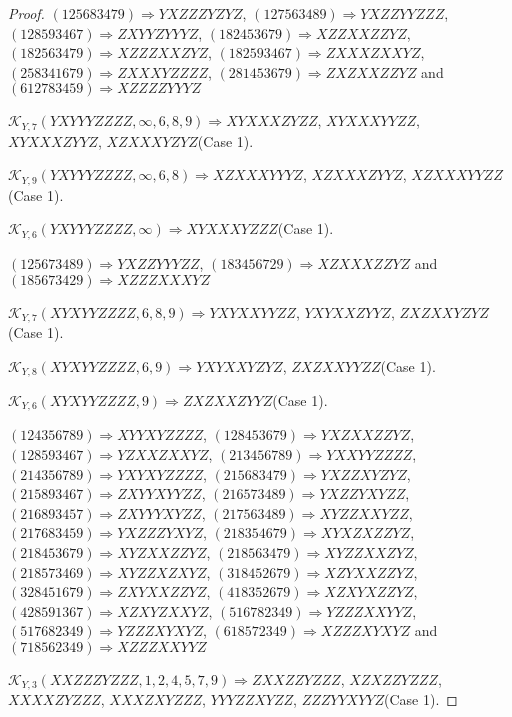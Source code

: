 \documentclass[12pt]{article}
\theoremstyle{plain}
\theoremstyle{definition}
\theoremstyle{remark}
\newcommand{\fancy}[1]{\mathcal{#1}}
\def\K{\fancy{K}}
\begin{document}
\begin{proof}
	$(1 2 5 6 8 3 4 7 9)\Rightarrow YXZZZYZYZ$, $(1 2 7 5 6 3 4 8 9)\Rightarrow YXZZYYZZZ$, $(1 2 8 5 9 3 4 6 7)\Rightarrow ZXYYZYYYZ$, $(1 8 2 4 5 3 6 7 9)\Rightarrow XZZXXZZYZ$, $(1 8 2 5 6 3 4 7 9)\Rightarrow XZZZXXZYZ$, $(1 8 2 5 9 3 4 6 7)\Rightarrow ZXXXZXXYZ$, $(2 5 8 3 4 1 6 7 9)\Rightarrow ZXXXYZZZZ$, $(2 8 1 4 5 3 6 7 9)\Rightarrow ZXZXXZZYZ$ and $(6 1 2 7 8 3 4 5 9)\Rightarrow XZZZZYYYZ$
	
	
	$\K_{Y,7}(YXYYYZZZZ,\infty,6, 8, 9)\Rightarrow $$XYXXXZYZZ$, $XYXXXYYZZ$, $XYXXXZYYZ$, $XZXXXYZYZ$(Case 1).
	
	$\K_{Y,9}(YXYYYZZZZ,\infty,6, 8)\Rightarrow $$XZXXXYYYZ$, $XZXXXZYYZ$, $XZXXXYYZZ$(Case 1).
	
	$\K_{Y,6}(YXYYYZZZZ,\infty)\Rightarrow $$XYXXXYZZZ$(Case 1).
	
	
	
	$(1 2 5 6 7 3 4 8 9)\Rightarrow YXZZYYYZZ$, $(1 8 3 4 5 6 7 2 9)\Rightarrow XZXXXZZYZ$ and $(1 8 5 6 7 3 4 2 9)\Rightarrow XZZZXXXYZ$
	
	
	$\K_{Y,7}(XYXYYZZZZ,6, 8, 9)\Rightarrow $$YXYXXYYZZ$, $YXYXXZYYZ$, $ZXZXXYZYZ$(Case 1).
	
	$\K_{Y,8}(XYXYYZZZZ,6, 9)\Rightarrow $$YXYXXYZYZ$, $ZXZXXYYZZ$(Case 1).
	
	$\K_{Y,6}(XYXYYZZZZ,9)\Rightarrow $$ZXZXXZYYZ$(Case 1).
	
	
	
	$(1 2 4 3 5 6 7 8 9)\Rightarrow XYYXYZZZZ$, $(1 2 8 4 5 3 6 7 9)\Rightarrow YXZXXZZYZ$, $(1 2 8 5 9 3 4 6 7)\Rightarrow YZXXZXXYZ$, $(2 1 3 4 5 6 7 8 9)\Rightarrow YXXYYZZZZ$, $(2 1 4 3 5 6 7 8 9)\Rightarrow YXYXYZZZZ$, $(2 1 5 6 8 3 4 7 9)\Rightarrow YXZZXYZYZ$, $(2 1 5 8 9 3 4 6 7)\Rightarrow ZXYYXYYZZ$, $(2 1 6 5 7 3 4 8 9)\Rightarrow YXZZYXYZZ$, $(2 1 6 8 9 3 4 5 7)\Rightarrow ZXYYYXYZZ$, $(2 1 7 5 6 3 4 8 9)\Rightarrow XYZZXXYZZ$, $(2 1 7 6 8 3 4 5 9)\Rightarrow YXZZZYXYZ$, $(2 1 8 3 5 4 6 7 9)\Rightarrow XYXZXZZYZ$, $(2 1 8 4 5 3 6 7 9)\Rightarrow XYZXXZZYZ$, $(2 1 8 5 6 3 4 7 9)\Rightarrow XYZZXXZYZ$, $(2 1 8 5 7 3 4 6 9)\Rightarrow XYZZXZXYZ$, $(3 1 8 4 5 2 6 7 9)\Rightarrow XZYXXZZYZ$, $(3 2 8 4 5 1 6 7 9)\Rightarrow ZXYXXZZYZ$, $(4 1 8 3 5 2 6 7 9)\Rightarrow XZXYXZZYZ$, $(4 2 8 5 9 1 3 6 7)\Rightarrow XZXYZXXYZ$, $(5 1 6 7 8 2 3 4 9)\Rightarrow YZZZXXYYZ$, $(5 1 7 6 8 2 3 4 9)\Rightarrow YZZZXYXYZ$, $(6 1 8 5 7 2 3 4 9)\Rightarrow XZZZXYXYZ$ and $(7 1 8 5 6 2 3 4 9)\Rightarrow XZZZXXYYZ$
	
	
	$\K_{Y,3}(XXZZZYZZZ,1, 2, 4, 5, 7, 9)\Rightarrow $$ZXXZZYZZZ$, $XZXZZYZZZ$, $XXXXZYZZZ$, $XXXZXYZZZ$, $YYYZZXYZZ$, $ZZZYYXYYZ$(Case 1).
	

\end{proof}
\end{document}
